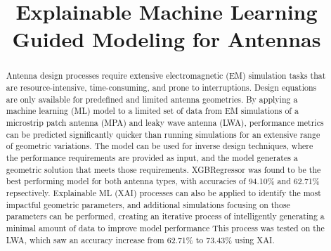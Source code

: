 \documentclass[conference]{IEEEtran}
\begin{document}
\title{Explainable Machine Learning Guided Modeling for Antennas\\
}

\author{
\and
{}
\and
{}
\and
{}
}

\maketitle

\begin{abstract}
    Antenna design processes require extensive electromagnetic (EM) simulation tasks that are resource-intensive, time-consuming, and prone to interruptions. Design equations are only available for predefined and limited antenna geometries. By applying a machine learning (ML) model to a limited set of data from EM simulations of a microstrip patch antenna (MPA) and leaky wave antenna (LWA), performance metrics can be predicted significantly quicker than running simulations for an extensive range of geometric variations. The model can be used for inverse design techniques, where the performance requirements are provided as input, and the model generates a geometric solution that meets those requirements. XGBRegressor was found to be the best performing model for both antenna types, with accuracies of 94.10\% and 62.71\% repsectively. Explainable ML (XAI) processes can also be applied to identify the most impactful geometric parameters, and additional simulations focusing on those parameters can be performed, creating an iterative process of intelligently generating a minimal amount of data to improve model performance This process was tested on the LWA, which saw an accuracy increase from 62.71\% to 73.43\% using XAI. 
\end{abstract}
\end{document}
